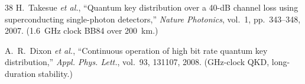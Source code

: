 \documentclass[11pt,a4paper]{article}
\begin{document}
\begin{thebibliography}{38}
H.~Takesue \textit{et al.}, ``Quantum key distribution over a 40-dB
channel loss using superconducting single-photon detectors,''
\textit{Nature Photonics}, vol.~1, pp.~343--348, 2007.  \hfill
(1.6~GHz clock BB84 over 200~km.)

A.~R.~Dixon \textit{et al.}, ``Continuous operation of high bit rate
quantum key distribution,'' \textit{Appl. Phys. Lett.}, vol.~93,
131107, 2008.  \hfill
(GHz-clock QKD, long-duration stability.)

\end{thebibliography}
\end{document}
